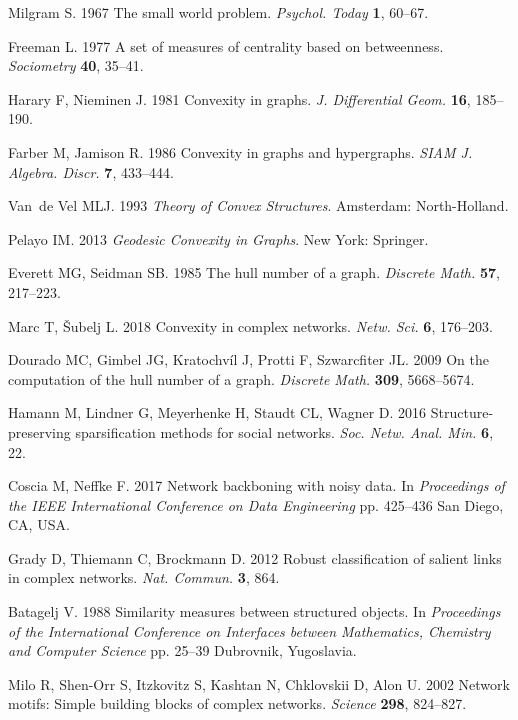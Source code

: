 \documentclass[]{rsif}
\begin{document}
\begin{thebibliography}{99}

Milgram S. 1967  The small world problem. {\em Psychol. Today} \textbf{1},
  60--67.

Freeman L. 1977  A set of measures of centrality based on betweenness. {\em
  Sociometry} \textbf{40}, 35--41.

Harary F, Nieminen J. 1981  Convexity in graphs. {\em J. Differential Geom.}
  \textbf{16}, 185--190.

Farber M, Jamison R. 1986  Convexity in graphs and hypergraphs. {\em SIAM J.
  Algebra. Discr.} \textbf{7}, 433--444.

Van~de Vel MLJ. 1993 {\em Theory of {Convex} {Structures}}.
Amsterdam: North-Holland.

Pelayo IM. 2013 {\em Geodesic {Convexity} in {Graphs}}.
New York: Springer.

Everett MG, Seidman SB. 1985  The hull number of a graph. {\em Discrete Math.}
  \textbf{57}, 217--223.

Marc T, {\v S}ubelj L. 2018  Convexity in complex networks. {\em Netw. Sci.}
  \textbf{6}, 176--203.

Dourado MC, Gimbel JG, Kratochv{\'i}l J, Protti F, Szwarcfiter JL. 2009  On the
  computation of the hull number of a graph. {\em Discrete Math.} \textbf{309},
  5668--5674.

Hamann M, Lindner G, Meyerhenke H, Staudt CL, Wagner D. 2016
  Structure-preserving sparsification methods for social networks. {\em Soc.
  Netw. Anal. Min.} \textbf{6}, 22.

Coscia M, Neffke F. 2017  Network backboning with noisy data. In {\em
  Proceedings of the {IEEE} {International} {Conference} on {Data}
  {Engineering}} pp. 425--436 San Diego, CA, USA.

Grady D, Thiemann C, Brockmann D. 2012  Robust classification of salient links
  in complex networks. {\em Nat. Commun.} \textbf{3}, 864.

Batagelj V. 1988  Similarity measures between structured objects. In {\em
  Proceedings of the {International} {Conference} on {Interfaces} between
  {Mathematics}, {Chemistry} and {Computer} {Science}} pp. 25--39 Dubrovnik,
  Yugoslavia.

Milo R, Shen-Orr S, Itzkovitz S, Kashtan N, Chklovskii D, Alon U. 2002  Network
  motifs: {Simple} building blocks of complex networks. {\em Science}
  \textbf{298}, 824--827.


\end{thebibliography}
\end{document}
